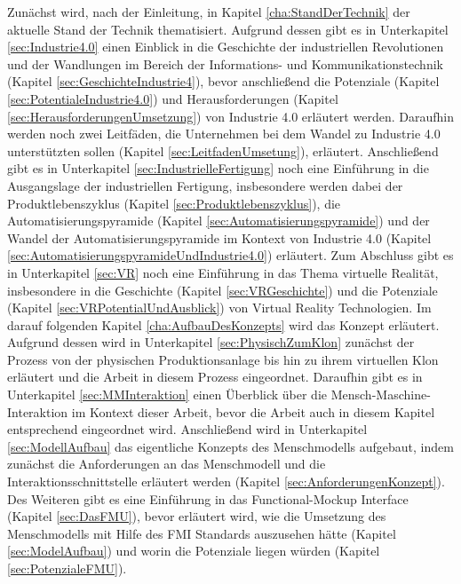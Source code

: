 \newline\newline
Zunächst wird, nach der Einleitung, in Kapitel \ref{cha:StandDerTechnik} der aktuelle Stand der Technik thematisiert. Aufgrund dessen gibt es in Unterkapitel \ref{sec:Industrie4.0} einen Einblick in die Geschichte der industriellen Revolutionen und der Wandlungen im Bereich der Informations- und Kommunikationstechnik (Kapitel \ref{sec:GeschichteIndustrie4}), bevor anschließend die Potenziale (Kapitel \ref{sec:PotentialeIndustrie4.0}) und Herausforderungen (Kapitel \ref{sec:HerausforderungenUmsetzung}) von Industrie 4.0 erläutert werden. Daraufhin werden noch zwei Leitfäden, die Unternehmen bei dem Wandel zu Industrie 4.0 unterstützten sollen (Kapitel \ref{sec:LeitfadenUmsetung}), erläutert. Anschließend gibt es in Unterkapitel \ref{sec:IndustrielleFertigung} noch eine Einführung in die Ausgangslage der industriellen Fertigung, insbesondere werden dabei der Produktlebenszyklus (Kapitel \ref{sec:Produktlebenszyklus}), die Automatisierungspyramide (Kapitel \ref{sec:Automatisierungspyramide}) und der Wandel der Automatisierungspyramide im Kontext von Industrie 4.0 (Kapitel \ref{sec:AutomatisierungspyramideUndIndustrie4.0}) erläutert. Zum Abschluss gibt es in Unterkapitel \ref{sec:VR} noch eine Einführung in das Thema virtuelle Realität, insbesondere in die Geschichte (Kapitel \ref{sec:VRGeschichte}) und die Potenziale (Kapitel \ref{sec:VRPotentialUndAusblick}) von Virtual Reality Technologien.
\newline
Im darauf folgenden Kapitel \ref{cha:AufbauDesKonzepts} wird das Konzept erläutert. Aufgrund dessen wird in Unterkapitel \ref{sec:PhysischZumKlon} zunächst der Prozess von der physischen Produktionsanlage bis hin zu ihrem virtuellen Klon erläutert und die Arbeit in diesem Prozess eingeordnet. Daraufhin gibt es in Unterkapitel \ref{sec:MMInteraktion} einen Überblick über die Mensch-Maschine-Interaktion im Kontext dieser Arbeit, bevor die Arbeit auch in diesem Kapitel entsprechend eingeordnet wird. Anschließend wird in Unterkapitel \ref{sec:ModellAufbau} das eigentliche Konzepts des Menschmodells aufgebaut, indem zunächst die Anforderungen an das Menschmodell und die Interaktionsschnittstelle erläutert werden (Kapitel \ref{sec:AnforderungenKonzept}). Des Weiteren gibt es eine Einführung in das Functional-Mockup Interface (Kapitel \ref{sec:DasFMU}), bevor erläutert wird, wie die Umsetzung des Menschmodells mit Hilfe des FMI Standards auszusehen hätte (Kapitel \ref{sec:ModelAufbau}) und worin die Potenziale liegen würden (Kapitel \ref{sec:PotenzialeFMU}).
